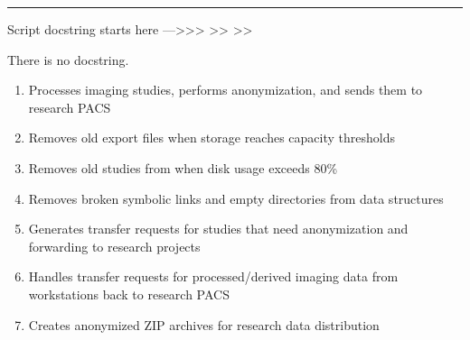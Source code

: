 \documentclass[letterpaper,10pt,english]{sphinxmanual}
\begin{document}
\bigskip\hrule\bigskip


\sphinxAtStartPar
Script docstring starts here —\textgreater{}\textgreater{}\textgreater{}
\textendash{}\textgreater{}\textgreater{}
\textendash{}\textgreater{}\textgreater{}

\sphinxAtStartPar
There is no docstring.
\begin{enumerate}
%
\item {} 
\sphinxAtStartPar
{\hyperref[\detokenize{Architecture/scripts/anonymizeAndSend::doc}]{}} \sphinxhyphen{} Processes imaging studies, performs anonymization, and sends them to research PACS

\item {} 
\sphinxAtStartPar
{\hyperref[\detokenize{Architecture/scripts/clearExports::doc}]{}} \sphinxhyphen{} Removes old export files when storage reaches capacity thresholds

\item {} 
\sphinxAtStartPar
{\hyperref[\detokenize{Architecture/scripts/clearOldFiles::doc}]{}} \sphinxhyphen{} Removes old studies from  when disk usage exceeds 80\%

\item {} 
\sphinxAtStartPar
{\hyperref[\detokenize{Architecture/scripts/clearStaleLinks::doc}]{}} \sphinxhyphen{} Removes broken symbolic links and empty directories from data structures

\item {} 
\sphinxAtStartPar
{\hyperref[\detokenize{Architecture/scripts/createTransferRequests::doc}]{}} \sphinxhyphen{} Generates transfer requests for studies that need anonymization and forwarding to research projects

\item {} 
\sphinxAtStartPar
{\hyperref[\detokenize{Architecture/scripts/createTransferRequestsForProcessed::doc}]{}} \sphinxhyphen{} Handles transfer requests for processed/derived imaging data from workstations back to research PACS

\item {} 
\sphinxAtStartPar
{\hyperref[\detokenize{Architecture/scripts/createZipFileCmd::doc}]{}} \sphinxhyphen{}  Creates anonymized ZIP archives for research data distribution


\end{enumerate}
\end{document}
